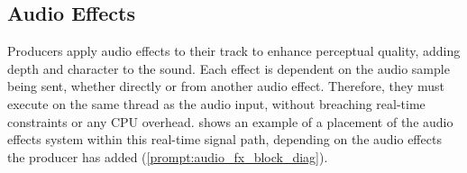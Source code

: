 \subsection{Audio Effects}

Producers apply audio effects to their track to enhance perceptual quality, 
adding depth and character to the sound. Each effect is dependent on the audio sample
being sent, whether directly or from another audio effect. Therefore, they must execute
on the same thread as the audio input, without breaching real-time constraints or any CPU overhead. 
 shows an example of a placement of the audio effects system within this real-time signal path, 
depending on the audio effects the producer has added (\cref{prompt:audio_fx_block_diag}).




